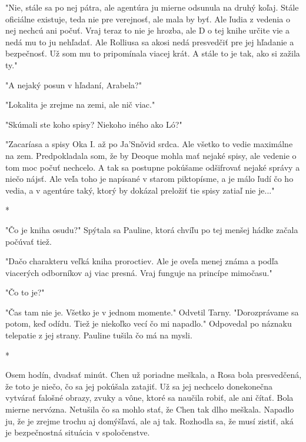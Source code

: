\documentclass{book}
\begin{document}
"$ $Nie, stále sa po nej pátra, ale agentúra ju mierne odsunula na druhý koľaj. Stále oficiálne existuje, teda nie pre verejnosť, ale mala by byť. Ale ľudia z vedenia o nej nechcú ani počuť. Vraj teraz to nie je hrozba, ale D o tej knihe určite vie a nedá mu to ju nehľadať. Ale Rolliusa sa akosi nedá presvedčiť pre jej hľadanie a bezpečnosť. Už som mu to pripomínala viacej krát. A stále to je tak, ako si zažila ty."$ $ 

"$ $A nejaký posun v hľadaní, Arabela?"$ $ 

"$ $Lokalita je zrejme na zemi, ale nič viac."$ $ 

"$ $Skúmali ste koho spisy? Niekoho iného ako Ló?"$ $ 

"$ $Zacaríasa a spisy Oka I. až po Ja'Sno\v{}vid srdca. Ale všetko to vedie maximálne na zem. Predpokladala som, že by Deoque mohla mať nejaké spisy, ale vedenie o tom moc počuť nechcelo. A tak sa postupne pokúšame odšifrovať nejaké správy a niečo nájsť. Ale veľa toho je napísané v starom piktopísme, a je málo ľudí čo ho vedia, a v agentúre taký, ktorý by dokázal preložiť tie spisy zatiaľ nie je..."$ $ 

\begin{center}

*

\end{center}

"$ $Čo je kniha osudu?"$ $  Spýtala sa Pauline, ktorá chvíľu po tej menšej hádke začala počúvať tiež.

"$ $Dačo charakteru veľká kniha proroctiev. Ale je oveľa menej známa a podľa viacerých odborníkov aj viac presná. Vraj funguje na princípe mimočasu."$ $ 

"$ $Čo to je?"$ $ 

"$ $Čas tam nie je. Všetko je v jednom momente."$ $  Odvetil Tarny. "$ $Dorozprávame sa potom, keď odídu. Tiež je niekoľko vecí čo mi napadlo."$ $  Odpovedal po náznaku telepatie z jej strany. Pauline tušila čo má na mysli.

\begin{center}

*

\end{center}

Osem hodín, dvadsať minút. Chen už poriadne meškala, a Rosa bola presvedčená, že toto je niečo, čo sa jej pokúšala zatajiť. Už sa jej nechcelo donekonečna vytvárať falošné obrazy, zvuky a vône, ktoré sa naučila robiť, ale ani čítať. Bola mierne nervózna. Netušila čo sa mohlo stať, že Chen tak dlho meškala. Napadlo ju, že je zrejme trochu aj domýšľavá, ale aj tak. Rozhodla sa, že musí zistiť, aká je bezpečnostná situácia v spoločenstve.
\end{document}
